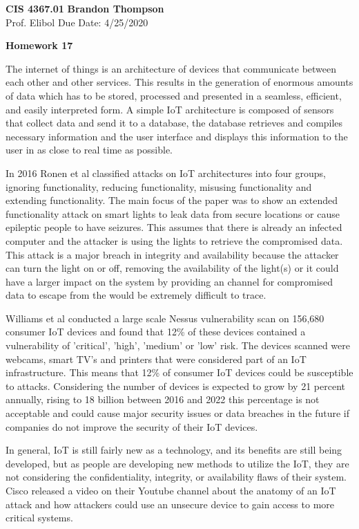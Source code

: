 \documentclass[12pt]{article}
\begin{document}
\noindent
\textbf{CIS 4367.01} \hfill \textbf{Brandon Thompson} \\
\normalsize Prof. Elibol \hfill Due Date: 4/25/2020 \\

\begin{center}
\textbf{Homework 17}
\end{center}

	\doublespacing

	The internet of things is an architecture of devices that communicate between 
	each other and other services. This results in the generation of enormous amounts
	of data which has to be stored, processed and presented in a seamless, efficient,
	and easily interpreted form. \cite{gubbi} A simple IoT architecture is composed
	of sensors that collect data and send it to a database, the database retrieves
	and compiles necessary information and the user interface and displays this information
	to the user in as close to real time as possible.

	In 2016 Ronen et al \cite{ronen} classified attacks on IoT architectures into four groups,
	ignoring functionality, reducing functionality, misusing functionality and extending
	functionality. The main focus of the paper was to show an extended functionality attack
	on smart lights to leak data from secure locations or cause epileptic people to have
	seizures. This assumes that there is already an infected computer and the attacker is
	using the lights to retrieve the compromised data. This attack is a major breach in
	integrity and availability because the attacker can turn the light on or off, removing
	the availability of the light(s) or it could have a larger impact on the system by providing
	an channel for compromised data to escape from the would be extremely difficult to trace.

	Williams et al \cite{williams} conducted a large scale Nessus vulnerability scan on 156,680
	consumer IoT devices and found that 12\% of these devices contained a vulnerability of
	'critical', 'high', 'medium' or 'low' risk. The devices scanned were webcams, smart TV's
	and printers that were considered part of an IoT infrastructure. This means that 12\% of
	consumer IoT devices could be susceptible to attacks. Considering the number of devices
	is expected to grow by 21 percent annually, rising to 18 billion between 2016 and 2022
	\cite{ericson}
	this percentage is not acceptable and could cause major security issues or data breaches
	in the future if companies do not improve the security of their IoT devices.

	In general, IoT is still fairly new as a technology, and its benefits are still being
	developed, but as people are developing new methods to utilize the IoT, they are not
	considering the confidentiality, integrity, or availability flaws of their system.
	Cisco released a video on their Youtube channel \cite{cisco} about the anatomy of an
	IoT attack and how attackers could use an unsecure device to gain access to more critical
	systems.

	\newpage
	{}
	
\end{document}
